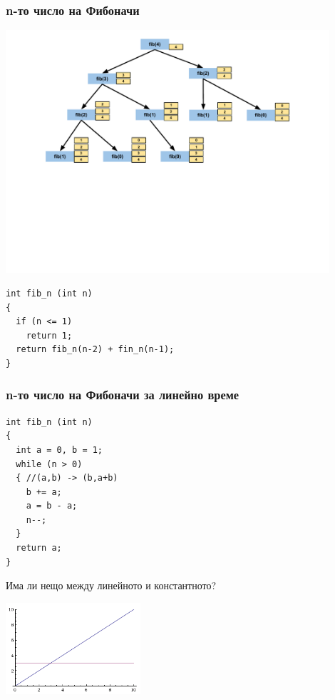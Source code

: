 \documentclass{beamer}
\begin{document}
\begin{frame}[fragile]
\frametitle{n-то число на Фибоначи}

\includegraphics[width=12cm]{images/fib_stack}

\vspace{-100px}

\begin{flushleft}
\begin{lstlisting}
int fib_n (int n)
{
  if (n <= 1)
    return 1;
  return fib_n(n-2) + fin_n(n-1);
}
\end{lstlisting}  
\end{flushleft}


\end{frame}


\begin{frame}[fragile]
\frametitle{n-то число на Фибоначи за линейно време}


\begin{flushleft}
\begin{lstlisting}
int fib_n (int n)
{
  int a = 0, b = 1;
  while (n > 0)
  { //(a,b) -> (b,a+b)
    b += a; 
    a = b - a;
    n--;
  }
  return a;
}
\end{lstlisting}  
\end{flushleft}


\end{frame}


\begin{frame}
\centerline{Има ли нещо между линейното и константното?}

\begin{center}
  \includegraphics[width=5cm]{images/linearandconst}
\end{center}
\end{frame}
\end{document}
